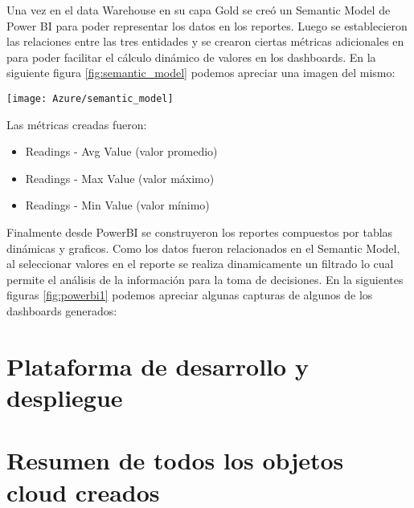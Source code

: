 Una vez en el data Warehouse en su capa Gold se creó un Semantic Model de Power BI para poder representar los datos en los reportes. Luego se establecieron las relaciones entre las tres entidades y se crearon ciertas métricas adicionales en para poder facilitar el cálculo dinámico de valores en los dashboards. En la siguiente figura \ref{fig:semantic_model} podemos apreciar una imagen del mismo:

\begin{center}
   \texttt{[image: Azure/semantic\_model]}
   \label{fig:semantic_model}
\end{center}

Las métricas creadas fueron:

\begin{itemize}
	\item Readings - Avg Value (valor promedio)
	\item Readings - Max Value (valor máximo)
	\item Readings - Min Value (valor mínimo)
\end{itemize}

Finalmente desde PowerBI se construyeron los reportes compuestos por tablas dinámicas y graficos. Como los datos fueron relacionados en el Semantic Model, al seleccionar valores en el reporte se realiza dinamicamente un filtrado lo cual permite el análisis de la información para la toma de decisiones. En la siguientes figuras \ref{fig:powerbi1} podemos apreciar algunas capturas de algunos de los dashboards generados:



\section{Plataforma de desarrollo y despliegue}



\section{Resumen de todos los objetos cloud creados}


